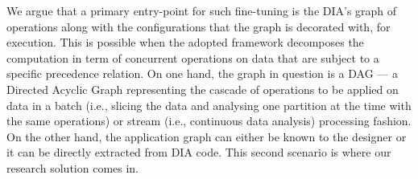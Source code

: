 \documentclass[smallextended]{svjour3}       %
\newcommand{\todoMB}[2]{\linespread{0.7}\todo[color=yellow!50,#1]{\scriptsize\textbf{MB:}#2}}
\begin{document}
We argue that a primary entry-point for such fine-tuning is the DIA's graph of operations along with the configurations that the graph is decorated with, for execution. 
This is possible when the adopted framework decomposes the computation in term of concurrent operations on data that are subject to a specific precedence relation.
On one hand, the graph in question is a DAG --- a Directed Acyclic Graph representing the cascade of operations to be applied on data in a batch (i.e., slicing the data and analysing one partition at the time with the same operations) or stream (i.e., continuous data analysis) processing fashion. On the other hand, the application graph can either be known to the designer or it can be directly extracted from DIA code. This second scenario is where our research solution comes in.
%
%
%
\end{document}
